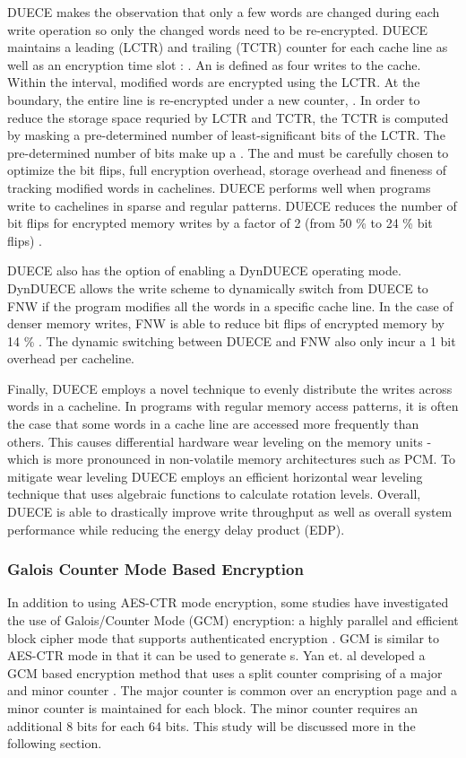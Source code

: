 DUECE makes the observation that only a few words are changed during each write
operation so only the changed words need to be re-encrypted. DUECE maintains a
leading (LCTR) and trailing (TCTR) counter for each cache line as well as an
encryption time slot : . An  is defined as four writes to
the cache. Within the  interval, modified words are encrypted using
the LCTR. At the  boundary, the entire line is re-encrypted under a
new counter, . In order to reduce the storage space requried by
LCTR and TCTR, the TCTR is computed by masking a pre-determined number of
least-significant bits of the LCTR. The pre-determined number of bits make up a
. The  and  must be carefully chosen to
optimize the bit flips, full encryption overhead, storage overhead and fineness
of tracking modified words in cachelines. DUECE performs well when programs
write to cachelines in sparse and regular patterns. DUECE reduces the number of
bit flips for encrypted memory writes by a factor of 2 (from 50 \%
to 24 \% bit flips) \cite{duece}.

DUECE also has the option of enabling a DynDUECE operating mode.  DynDUECE
allows the write scheme to dynamically switch from DUECE to FNW if the program
modifies all the words in a specific cache line. In the case of denser memory
writes, FNW is able to reduce bit flips of encrypted memory by 14 \%
\cite{duece}. The dynamic switching between DUECE and FNW also only incur a 1
bit overhead per cacheline.

Finally, DUECE employs a novel  technique to
evenly distribute the writes across words in a cacheline. In programs with
regular memory access patterns, it is often the case that some words in a cache
line are accessed more frequently than others. This causes differential
hardware wear leveling on the memory units - which is more pronounced in
non-volatile memory architectures such as PCM. To mitigate wear leveling DUECE
employs an efficient horizontal wear leveling technique that uses algebraic
functions to calculate rotation levels. Overall, DUECE is able to drastically
improve write throughput as well as overall system performance while reducing
the energy delay product (EDP).

\subsubsection{Galois Counter Mode Based Encryption}
In addition to using AES-CTR mode encryption, some studies have investigated
the use of Galois/Counter Mode (GCM) encryption: a highly parallel and
efficient block cipher mode that supports authenticated encryption
\cite{nistGCM}. GCM is similar to AES-CTR mode in that it can be used to
generate s. Yan et.  al developed a GCM based encryption method that
uses a split counter comprising of a major and minor counter \cite{gcmMem}. The
major counter is common over an encryption page and a minor counter is
maintained for each block. The minor counter requires an additional 8 bits for
each 64 bits. This study will be discussed more in the following section.

